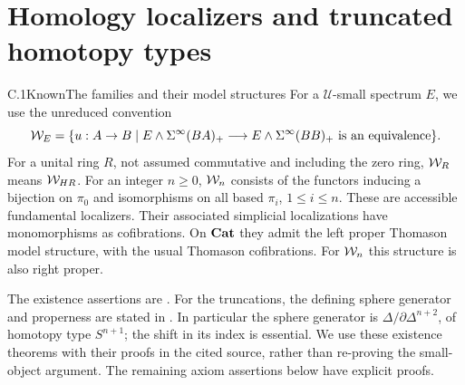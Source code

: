 \section{Homology localizers and truncated homotopy types}

\begin{claim}{C.1}{Known}{The families and their model structures}
For a $\mathcal U$-small spectrum $E$, we use the unreduced convention
\[
 \mathcal{W}_E=\{u:A\to B\mid E\wedge\Sigma^\infty(BA)_+
       \longrightarrow E\wedge\Sigma^\infty(BB)_+\text{ is an equivalence}\}.
\]
For a unital ring $R$, not assumed commutative and including the zero ring, $\mathcal{W}_R$ means
$\mathcal{W}_{HR}$. For an integer $n\geq0$, $\mathcal{W}_n$ consists of the functors inducing
a bijection on $\pi_0$ and isomorphisms on all based $\pi_i$, $1\leq i\leq n$.
These are accessible fundamental localizers. Their associated simplicial
localizations have monomorphisms as cofibrations. On $\mathbf{Cat}$ they admit the
left proper Thomason model structure, with the usual Thomason cofibrations.
For $\mathcal{W}_n$ this structure is also right proper.
\end{claim}
The existence assertions are \citet[Theorem 9.4.2, Corollary 9.4.3,
Theorem 5.2.15]{RootCisinski2006}. For the truncations, the defining sphere
generator and properness are stated in \citet[9.2.1, Corollary 9.2.15,
Proposition 9.2.17]{RootCisinski2006}. In particular the sphere generator
is $\Delta/\partial\Delta^{n+2}$, of homotopy type $S^{n+1}$; the shift
in its index is essential. We use these existence theorems with their
proofs in the cited source, rather than re-proving the small-object
argument. The remaining axiom assertions below have explicit proofs.

